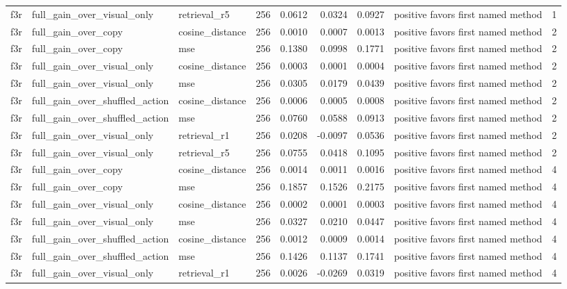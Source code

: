\begin{tabular}{lllrrrrlr}
f3r & full\_gain\_over\_visual\_only & retrieval\_r5 & 256 & 0.0612 & 0.0324 & 0.0927 & positive favors first named method & 1 \\
f3r & full\_gain\_over\_copy & cosine\_distance & 256 & 0.0010 & 0.0007 & 0.0013 & positive favors first named method & 2 \\
f3r & full\_gain\_over\_copy & mse & 256 & 0.1380 & 0.0998 & 0.1771 & positive favors first named method & 2 \\
f3r & full\_gain\_over\_visual\_only & cosine\_distance & 256 & 0.0003 & 0.0001 & 0.0004 & positive favors first named method & 2 \\
f3r & full\_gain\_over\_visual\_only & mse & 256 & 0.0305 & 0.0179 & 0.0439 & positive favors first named method & 2 \\
f3r & full\_gain\_over\_shuffled\_action & cosine\_distance & 256 & 0.0006 & 0.0005 & 0.0008 & positive favors first named method & 2 \\
f3r & full\_gain\_over\_shuffled\_action & mse & 256 & 0.0760 & 0.0588 & 0.0913 & positive favors first named method & 2 \\
f3r & full\_gain\_over\_visual\_only & retrieval\_r1 & 256 & 0.0208 & -0.0097 & 0.0536 & positive favors first named method & 2 \\
f3r & full\_gain\_over\_visual\_only & retrieval\_r5 & 256 & 0.0755 & 0.0418 & 0.1095 & positive favors first named method & 2 \\
f3r & full\_gain\_over\_copy & cosine\_distance & 256 & 0.0014 & 0.0011 & 0.0016 & positive favors first named method & 4 \\
f3r & full\_gain\_over\_copy & mse & 256 & 0.1857 & 0.1526 & 0.2175 & positive favors first named method & 4 \\
f3r & full\_gain\_over\_visual\_only & cosine\_distance & 256 & 0.0002 & 0.0001 & 0.0003 & positive favors first named method & 4 \\
f3r & full\_gain\_over\_visual\_only & mse & 256 & 0.0327 & 0.0210 & 0.0447 & positive favors first named method & 4 \\
f3r & full\_gain\_over\_shuffled\_action & cosine\_distance & 256 & 0.0012 & 0.0009 & 0.0014 & positive favors first named method & 4 \\
f3r & full\_gain\_over\_shuffled\_action & mse & 256 & 0.1426 & 0.1137 & 0.1741 & positive favors first named method & 4 \\
f3r & full\_gain\_over\_visual\_only & retrieval\_r1 & 256 & 0.0026 & -0.0269 & 0.0319 & positive favors first named method & 4 \\

\end{tabular}

